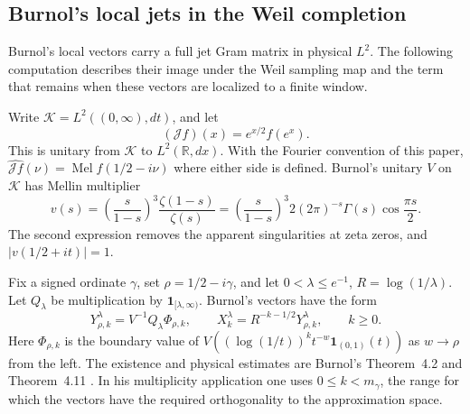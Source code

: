 \subsection{Burnol's local jets in the Weil completion}
\label{subsec:fd-burnol-weil}

Burnol's local vectors carry a full jet Gram matrix in physical
\(L^2\). The following computation describes their image under the
Weil sampling map and the term that remains when these vectors are
localized to a finite window.

Write \(\mathcal K=L^2((0,\infty),dt)\), and let
\[
 (\mathcal J f)(x)=e^{x/2}f(e^x).
\]
This is unitary from \(\mathcal K\) to \(L^2(\mathbb R,dx)\).
With the Fourier convention of this paper,
\(\widehat{\mathcal J f}(\nu)=\operatorname{Mel}f(1/2-i\nu)\)
where either side is defined. Burnol's unitary \(V\) on
\(\mathcal K\) has Mellin multiplier
\[
 v(s)=\left(\frac{s}{1-s}\right)^3
                \frac{\zeta(1-s)}{\zeta(s)}
 =\left(\frac{s}{1-s}\right)^3
       2(2\pi)^{-s}\Gamma(s)\cos\frac{\pi s}{2}.
\]
The second expression removes the apparent singularities at zeta
zeros, and \(|v(1/2+it)|=1\).

Fix a signed ordinate \(\gamma\), set \(\rho=1/2-i\gamma\),
and let \(0<\lambda\le e^{-1}\), \(R=\log(1/\lambda)\).
Let \(Q_\lambda\) be multiplication by
\(\mathbf1_{[\lambda,\infty)}\). Burnol's vectors have the
form
\[
 Y_{\rho,k}^{\lambda}=V^{-1}Q_\lambda\Phi_{\rho,k},
 \qquad
 X_k^\lambda=R^{-k-1/2}Y_{\rho,k}^{\lambda},
 \qquad k\ge0.
\]
Here \(\Phi_{\rho,k}\) is the boundary value of
\(V((\log(1/t))^k t^{-w}\mathbf1_{(0,1)}(t))\) as
\(w\to\rho\) from the left. The existence and physical
estimates are Burnol's Theorem~4.2 and Theorem~4.11
\cite[pp.~9--13]{burnol2002}. In his multiplicity application one
uses \(0\le k<m_\gamma\), the range for which the vectors have
the required orthogonality to the approximation space.

